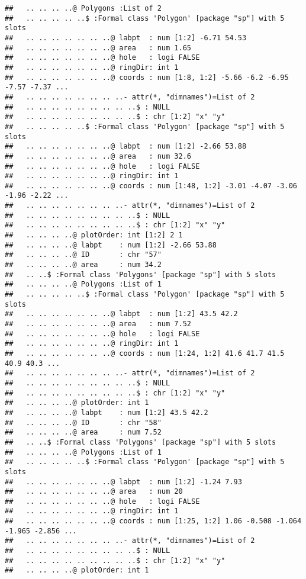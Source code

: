 \documentclass[]{article}
\begin{document}
\begin{verbatim}
##   .. .. .. ..@ Polygons :List of 2
##   .. .. .. .. ..$ :Formal class 'Polygon' [package "sp"] with 5 slots
##   .. .. .. .. .. .. ..@ labpt  : num [1:2] -6.71 54.53
##   .. .. .. .. .. .. ..@ area   : num 1.65
##   .. .. .. .. .. .. ..@ hole   : logi FALSE
##   .. .. .. .. .. .. ..@ ringDir: int 1
##   .. .. .. .. .. .. ..@ coords : num [1:8, 1:2] -5.66 -6.2 -6.95 -7.57 -7.37 ...
##   .. .. .. .. .. .. .. ..- attr(*, "dimnames")=List of 2
##   .. .. .. .. .. .. .. .. ..$ : NULL
##   .. .. .. .. .. .. .. .. ..$ : chr [1:2] "x" "y"
##   .. .. .. .. ..$ :Formal class 'Polygon' [package "sp"] with 5 slots
##   .. .. .. .. .. .. ..@ labpt  : num [1:2] -2.66 53.88
##   .. .. .. .. .. .. ..@ area   : num 32.6
##   .. .. .. .. .. .. ..@ hole   : logi FALSE
##   .. .. .. .. .. .. ..@ ringDir: int 1
##   .. .. .. .. .. .. ..@ coords : num [1:48, 1:2] -3.01 -4.07 -3.06 -1.96 -2.22 ...
##   .. .. .. .. .. .. .. ..- attr(*, "dimnames")=List of 2
##   .. .. .. .. .. .. .. .. ..$ : NULL
##   .. .. .. .. .. .. .. .. ..$ : chr [1:2] "x" "y"
##   .. .. .. ..@ plotOrder: int [1:2] 2 1
##   .. .. .. ..@ labpt    : num [1:2] -2.66 53.88
##   .. .. .. ..@ ID       : chr "57"
##   .. .. .. ..@ area     : num 34.2
##   .. ..$ :Formal class 'Polygons' [package "sp"] with 5 slots
##   .. .. .. ..@ Polygons :List of 1
##   .. .. .. .. ..$ :Formal class 'Polygon' [package "sp"] with 5 slots
##   .. .. .. .. .. .. ..@ labpt  : num [1:2] 43.5 42.2
##   .. .. .. .. .. .. ..@ area   : num 7.52
##   .. .. .. .. .. .. ..@ hole   : logi FALSE
##   .. .. .. .. .. .. ..@ ringDir: int 1
##   .. .. .. .. .. .. ..@ coords : num [1:24, 1:2] 41.6 41.7 41.5 40.9 40.3 ...
##   .. .. .. .. .. .. .. ..- attr(*, "dimnames")=List of 2
##   .. .. .. .. .. .. .. .. ..$ : NULL
##   .. .. .. .. .. .. .. .. ..$ : chr [1:2] "x" "y"
##   .. .. .. ..@ plotOrder: int 1
##   .. .. .. ..@ labpt    : num [1:2] 43.5 42.2
##   .. .. .. ..@ ID       : chr "58"
##   .. .. .. ..@ area     : num 7.52
##   .. ..$ :Formal class 'Polygons' [package "sp"] with 5 slots
##   .. .. .. ..@ Polygons :List of 1
##   .. .. .. .. ..$ :Formal class 'Polygon' [package "sp"] with 5 slots
##   .. .. .. .. .. .. ..@ labpt  : num [1:2] -1.24 7.93
##   .. .. .. .. .. .. ..@ area   : num 20
##   .. .. .. .. .. .. ..@ hole   : logi FALSE
##   .. .. .. .. .. .. ..@ ringDir: int 1
##   .. .. .. .. .. .. ..@ coords : num [1:25, 1:2] 1.06 -0.508 -1.064 -1.965 -2.856 ...
##   .. .. .. .. .. .. .. ..- attr(*, "dimnames")=List of 2
##   .. .. .. .. .. .. .. .. ..$ : NULL
##   .. .. .. .. .. .. .. .. ..$ : chr [1:2] "x" "y"
##   .. .. .. ..@ plotOrder: int 1

\end{verbatim}
\end{document}
